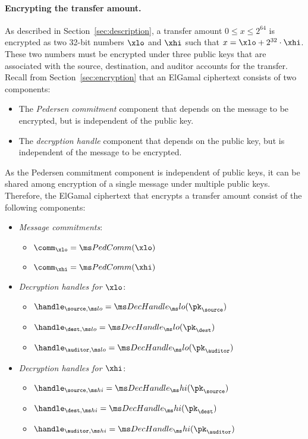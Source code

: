 \paragraph{Encrypting the transfer amount.} 
As described in
Section~\ref{sec:description}, a transfer amount $0 \le x \le 2^{64}$ is
encrypted as two 32-bit numbers $\xlo$ and $\xhi$ such that $x = \xlo +
2^{32} \cdot \xhi$. These two numbers must be encrypted under three public keys that are
associated with the source, destination, and auditor accounts for the transfer.
Recall from Section~\ref{sec:encryption} that an ElGamal ciphertext consists of
two components:
\begin{itemize}
  \item The \emph{Pedersen commitment} component that depends on the message to
    be encrypted, but is independent of the public key.
  \item The \emph{decryption handle} component that depends on the public key,
    but is independent of the message to be encrypted.
\end{itemize}
As the Pedersen commitment component is independent of public keys, it can be
shared among encryption of a single message under multiple public keys.
Therefore, the ElGamal ciphertext that encrypts a transfer amount consist of the
following components:
\begin{itemize}
  \item \emph{Message commitments}: 
    \begin{itemize}
      \item $\comm_{\xlo} = \PedComm(\xlo)$
      \item $\comm_{\xhi} = \PedComm(\xhi)$
    \end{itemize}

  \item \emph{Decryption handles for $\xlo$}: 
    \begin{itemize}
      \item $\handle_{\source, \lo} = \DecHandle_\lo(\pk_\source)$
      \item $\handle_{\dest, \lo} = \DecHandle_\lo(\pk_\dest)$
      \item $\handle_{\auditor, \lo} = \DecHandle_\lo(\pk_\auditor)$
    \end{itemize}

  \item \emph{Decryption handles for $\xhi$}: 
    \begin{itemize}
      \item $\handle_{\source, \hi} = \DecHandle_\hi(\pk_\source)$
      \item $\handle_{\dest, \hi} = \DecHandle_\hi(\pk_\dest)$
      \item $\handle_{\auditor, \hi} = \DecHandle_\hi(\pk_\auditor)$
    \end{itemize}

\end{itemize}

